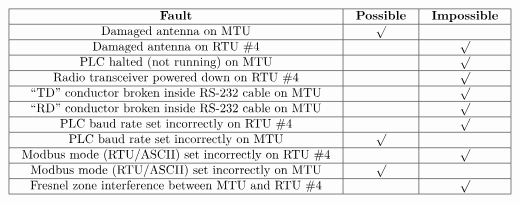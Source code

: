 $$\vbox{\offinterlineskip
\halign{\strut
\vrule \quad\hfil # \ \hfil & 
\vrule \quad\hfil # \ \hfil & 
\vrule \quad\hfil # \ \hfil \vrule \cr
\noalign{\hrule}
%
{\bf Fault} & {\bf Possible} & {\bf Impossible} \cr
%
\noalign{\hrule}
%
Damaged antenna on MTU & $\surd$ &  \cr
%
\noalign{\hrule}
%
Damaged antenna on RTU \#4 &  & $\surd$ \cr
%
\noalign{\hrule}
%
PLC halted (not running) on MTU &  & $\surd$ \cr
%
\noalign{\hrule}
%
Radio transceiver powered down on RTU \#4 &  & $\surd$ \cr
%
\noalign{\hrule}
%
``TD'' conductor broken inside RS-232 cable on MTU &  & $\surd$ \cr
%
\noalign{\hrule}
%
``RD'' conductor broken inside RS-232 cable on MTU &  & $\surd$ \cr
%
\noalign{\hrule}
%
PLC baud rate set incorrectly on RTU \#4 &  & $\surd$ \cr
%
\noalign{\hrule}
%
PLC baud rate set incorrectly on MTU & $\surd$ &  \cr
%
\noalign{\hrule}
%
Modbus mode (RTU/ASCII) set incorrectly on RTU \#4 &  & $\surd$ \cr
%
\noalign{\hrule}
%
Modbus mode (RTU/ASCII) set incorrectly on MTU & $\surd$ &  \cr
%
\noalign{\hrule}
%
Fresnel zone interference between MTU and RTU \#4 &  & $\surd$ \cr
%
\noalign{\hrule}
} %
}$$ %





